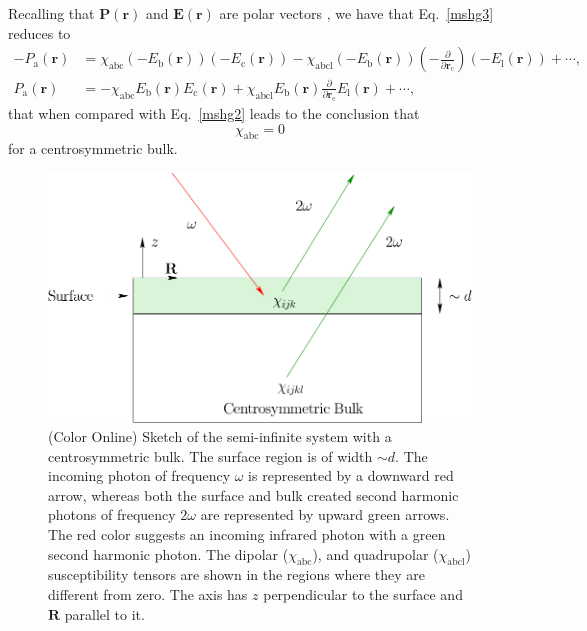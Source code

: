 Recalling that $\mathbf{P}(\mathbf{r})$ and $\mathbf{E}(\mathbf{r})$ are polar vectors 
\cite{jackson_classical_1975}, we have that Eq.~\eqref{mshg3} reduces to
\begin{align}\label{mshg4}
-P_{\mathrm{a}}(\mathbf{r})&=\chi_{\mathrm{abc}}(-E_{\mathrm{b}}(\mathbf{r}))(-E_{\mathrm{c}}(\mathbf{r}))
-
\chi_{\mathrm{abc}\mathrm{l}}(-E_{\mathrm{b}}(\mathbf{r}))(-\frac{\partial}{\partial\mathbf{r}_{\mathrm{c}}})(-
E_{\mathrm{l}}(\mathbf{r})) 
+\cdots,
\nonumber \\
P_{\mathrm{a}}(\mathbf{r})&=-\chi_{\mathrm{abc}}E_{\mathrm{b}}(\mathbf{r})E_{\mathrm{c}}(\mathbf{r})
+
\chi_{\mathrm{abc}\mathrm{l}}E_{\mathrm{b}}(\mathbf{r})\frac{\partial}{\partial\mathbf{r}_{\mathrm{c}}}
E_{\mathrm{l}}(\mathbf{r}) 
+\cdots,
\end{align}
that when compared with Eq.~\eqref{mshg2} leads to the conclusion that
\begin{equation}\label{sshg}
\chi_{\mathrm{abc}}=0
\end{equation}
for a centrosymmetric bulk.

\begin{figure}[t]
\centering
\includegraphics[scale=0.6]{figures/01-nonlocal_chi2/system.pdf}
\caption{(Color Online) Sketch of the semi-infinite system with a 
centrosymmetric bulk. The surface region is of width $\sim d$. 
The incoming photon of frequency $\omega$ is represented by
a downward red arrow, whereas both the surface and bulk created second
harmonic photons of frequency $2\omega$ are represented by upward
green arrows. The red color suggests an incoming infrared photon with
a green second harmonic photon. The dipolar ($\chi_{\mathrm{abc}}$), and 
quadrupolar ($\chi_{\mathrm{abc}\mathrm{l}}$) susceptibility tensors are shown 
in the regions where they are different from zero. The axis has $z$
perpendicular to the surface and $\mathbf{R}$ parallel to it.\label{fsystem}}
\end{figure}

